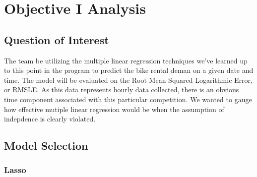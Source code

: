 \documentclass[american,]{article}
\newenvironment{Shaded}{\begin{snugshade}}{\end{snugshade}}
\newcommand{\DecValTok}[1]{\textcolor[rgb]{0.00,0.00,0.81}{#1}}
\newcommand{\FloatTok}[1]{\textcolor[rgb]{0.00,0.00,0.81}{#1}}
\newcommand{\KeywordTok}[1]{\textcolor[rgb]{0.13,0.29,0.53}{\textbf{#1}}}
\newcommand{\NormalTok}[1]{#1}
\newcommand{\OperatorTok}[1]{\textcolor[rgb]{0.81,0.36,0.00}{\textbf{#1}}}
\newcommand{\OtherTok}[1]{\textcolor[rgb]{0.56,0.35,0.01}{#1}}
\newcommand{\StringTok}[1]{\textcolor[rgb]{0.31,0.60,0.02}{#1}}
\begin{document}
\newpage

\hypertarget{objective-i-analysis}{%
\section{Objective I Analysis}\label{objective-i-analysis}}

\hypertarget{question-of-interest}{%
\subsection{Question of Interest}\label{question-of-interest}}

The team be utilizing the multiple linear regression techniques we've learned up to this point in the program to predict the bike rental deman on a given date and time. The model will be evaluated on the Root Mean Squared Logarithmic Error, or RMSLE. As this data represents hourly data collected, there is an obvious time component associated with this particular competition. We wanted to gauge how effective mutiple linear regression would be when the assumption of indepdence is clearly violated.

\hypertarget{model-selection}{%
\subsection{Model Selection}\label{model-selection}}

\hypertarget{lasso}{%
\subsubsection{Lasso}\label{lasso}}

\begin{Shaded}
\end{Shaded}
\end{document}
